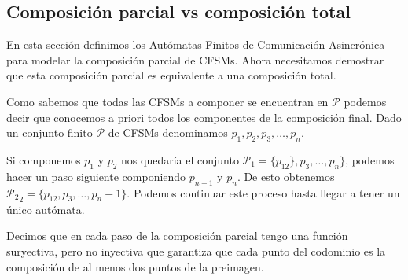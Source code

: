 



\subsection{Composición parcial vs composición total}
En esta sección definimos los Autómatas Finitos de Comunicación Asincrónica para modelar la composición parcial de CFSMs. Ahora necesitamos demostrar que esta composición parcial es equivalente a una composición total.

Como sabemos que todas las CFSMs a componer se encuentran en $\mathcal{P}$ podemos decir que conocemos a priori todos los componentes de la composición final. Dado un conjunto finito $\mathcal{P}$ de CFSMs denominamos $ p_1, p_2, p_3, \ldots, p_n$. 

Si componemos $p_1$ y $p_2$ nos quedaría el conjunto $\mathcal{P}_1 =\{ p_{12} \}, p_3, \ldots, p_n \} $, podemos hacer un paso siguiente componiendo $p_{n-1}$ y $p_n$. De esto obtenemos $\mathcal{P_2}_2= \{ p_{12}, p_3, \ldots, p_n-1 \} $. Podemos continuar este proceso hasta llegar a tener un único autómata. %

Decimos que en cada paso de la composición parcial tengo una función suryectiva, pero no inyectiva que garantiza que cada punto del codominio es la composición de al menos dos puntos de la preimagen.

